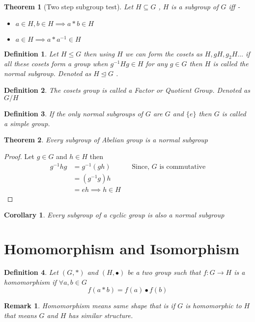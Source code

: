 \documentclass[12pt,a4paper]{article}
\newtheorem{thm}{Theorem}
\newtheorem*{defn}{Definition}
\newtheorem*{rem}{Remark}
\newtheorem*{cor}{Corollary}
\begin{document}
\begin{thm}[Two step subgroup test]
	Let $H \subseteq G$ , $H$ is a subgroup of $G$ iff -
	\begin{itemize}
		\item $a \in H, b\in H \implies a*b \in H$
		\item $a \in H \implies a*a^{-1} \in H$
	\end{itemize}
\end{thm}
\begin{defn} \normalfont
	Let $H \le G$ then using $H$ we can form the cosets as $H, gH, g_{2}H \dots$ if all these cosets form a group when $g^{-1}Hg \in H$ for any $g\in G$ then $H$ is called the normal subgroup. Denoted as $H \trianglelefteq G$ .
\end{defn}
\begin{defn} \normalfont
	The cosets group is called a Factor or Quotient Group. Denoted as $G/H$
\end{defn}
\begin{defn} \normalfont
	If the only normal subgroups of $G$ are $G$ and $\{e\}$ then $G$ is called a simple group.
\end{defn}

\begin{thm}
	Every subgroup of Abelian group is a normal subgroup
\end{thm}
\begin{proof}
	Let $g\in G$ and $h \in H$ then
	\begin{align*}
		g^{-1}hg &= g^{-1}(gh)		&& \text{Since, $G$ is commutative} \\
			     &= (g^{-1}g)h \\
			     &= eh \implies h \in H
	\end{align*}
\end{proof}
\begin{cor}
\normalfont	Every subgroup of a cyclic group is also a normal subgroup
\end{cor}
\section{Homomorphism and Isomorphism}
\begin{defn} \normalfont
	Let $(G,*)$ and $(H,\bullet)$ be a two group such that $f: G \to H$ is a homomorphism if $\forall a,b \in G$ 
	$$
		f(a*b) = f(a) \bullet f(b)
	$$
\end{defn}
\begin{rem}
	Homomorphism means same shape that is if $G$ is homomorphic to $H$ that means $G$ and $H$ has similar structure.
\end{rem}
\end{document}
